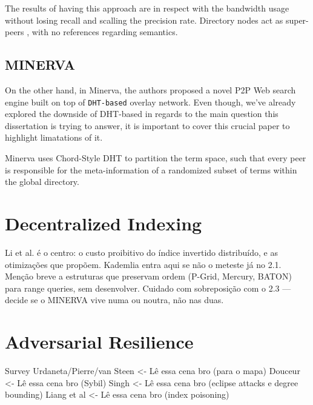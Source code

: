 The results of having this approach are in respect with the bandwidth usage without losing recall and scalling the precision rate. Directory nodes act as super-peers \cite{lu2003hybrid}, with no references regarding semantics.


\subsection{MINERVA}
\label{sec:rw:minerva}
On the other hand, in Minerva, the authors proposed a novel P2P Web search engine built on top of \texttt{DHT-based} overlay network. Even though, we've already explored the downside of DHT-based in regards to the main question this dissertation is trying to answer, it is important to cover this crucial paper to highlight limatations of it.

Minerva uses Chord-Style DHT \cite{stoica2001chord} to partition the term space, such that every peer is responsible for the meta-information of a randomized subset of terms within the global directory.



\section{Decentralized Indexing}
\label{sec:rw:indexing}
Li et al. é o centro: o custo proibitivo do índice invertido distribuído, e as otimizações que propõem. Kademlia entra aqui se não o meteste já no 2.1. Menção breve a estruturas que preservam ordem (P-Grid, Mercury, BATON) para range queries, sem desenvolver. Cuidado com sobreposição com o 2.3 — decide se o MINERVA vive numa ou noutra, não nas duas.

\section{Adversarial Resilience}
\label{sec:rw:adversarial}
Survey Urdaneta/Pierre/van Steen <- Lê essa cena bro (para o mapa)
Douceur <- Lê essa cena bro (Sybil)
Singh <- Lê essa cena bro (eclipse attacks e degree bounding)
Liang et al <- Lê essa cena bro (index poisoning)


